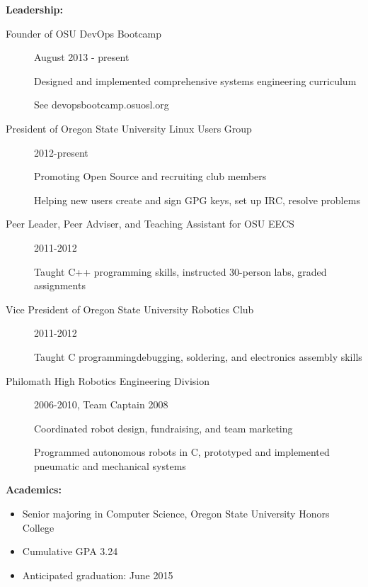 \documentclass[11pt]{article}
\begin{document}
{\Large \bf Leadership:}
\begin{description}
    \item[Founder of OSU DevOps Bootcamp]
        \hfill August 2013 - present
        
        Designed and implemented comprehensive systems engineering curriculum

        See devopsbootcamp.osuosl.org

    \item[President of Oregon State University Linux Users Group]
        \hfill 2012-present

        Promoting Open Source and recruiting club members

        Helping new users create and sign GPG keys, set up IRC, resolve problems

    \item[Peer Leader, Peer Adviser, and Teaching Assistant for OSU EECS]
        \hfill 2011-2012

        Taught C++ programming skills, instructed 30-person labs, graded
        assignments

    \item[Vice President of Oregon State University Robotics Club]
        \hfill 2011-2012

        Taught C programming\/debugging, soldering, and electronics assembly skills

    \item[Philomath High Robotics Engineering Division]
        \hfill 2006-2010, Team Captain 2008

        Coordinated robot design, fundraising, and team marketing

        Programmed autonomous robots in C, prototyped and implemented
        pneumatic and mechanical systems

\end{description}

\smallskip
\hrulefill
\bigskip

{\Large \bf Academics:}
\begin{itemize}
    \item Senior majoring in Computer Science, Oregon State University
          Honors College

    \item Cumulative GPA 3.24

    \item Anticipated graduation: June 2015

\end{itemize}
\end{document}
